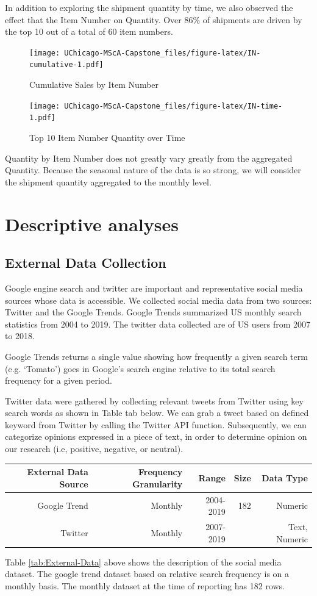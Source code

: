 \documentclass[12pt,oneside]{chicagocapstone}
\begin{document}
In addition to exploring the shipment quantity by time, we also observed
the effect that the Item Number on Quantity. Over 86\% of shipments are
driven by the top 10 out of a total of 60 item numbers.
\begin{figure}
\centering
\texttt{[image: UChicago-MScA-Capstone\_files/figure-latex/IN-cumulative-1.pdf]}
\caption{\label{fig:IN-cumulative}Cumulative Sales by Item Number}
\end{figure}
\begin{figure}
\centering
\texttt{[image: UChicago-MScA-Capstone\_files/figure-latex/IN-time-1.pdf]}
\caption{\label{fig:IN-time}Top 10 Item Number Quantity over Time}
\end{figure}
Quantity by Item Number does not greatly vary greatly from the
aggregated Quantity. Because the seasonal nature of the data is so
strong, we will consider the shipment quantity aggregated to the monthly
level.

\section*{Descriptive analyses}\label{methodology-descriptive}

\subsection*{External Data Collection}\label{methodology-external-data}

Google engine search and twitter are important and representative social
media sources whose data is accessible. We collected social media data
from two sources: Twitter and the Google Trends. Google Trends
summarized US monthly search statistics from 2004 to 2019. The twitter
data collected are of US users from 2007 to 2018.

Google Trends returns a single value showing how frequently a given
search term (e.g. `Tomato') goes in Google's search engine relative to
its total search frequency for a given period.

Twitter data were gathered by collecting relevant tweets from Twitter
using key search words as shown in Table tab below. We can grab a tweet
based on defined keyword from Twitter by calling the Twitter API
function. Subsequently, we can categorize opinions expressed in a piece
of text, in order to determine opinion on our research (i.e, positive,
negative, or neutral).
\begin{longtable}[]{@{}rrrrr@{}}
\toprule
External Data Source & Frequency Granularity & Range & Size & Data
Type\tabularnewline
\midrule
\endhead
Google Trend & Monthly & 2004-2019 & 182 & Numeric\tabularnewline
Twitter & Monthly & 2007-2019 & & Text, Numeric\tabularnewline
\bottomrule
\end{longtable}
Table \ref{tab:External-Data} above shows the description of the social
media dataset. The google trend dataset based on relative search
frequency is on a monthly basis. The monthly dataset at the time of
reporting has 182 rows.
\end{document}
